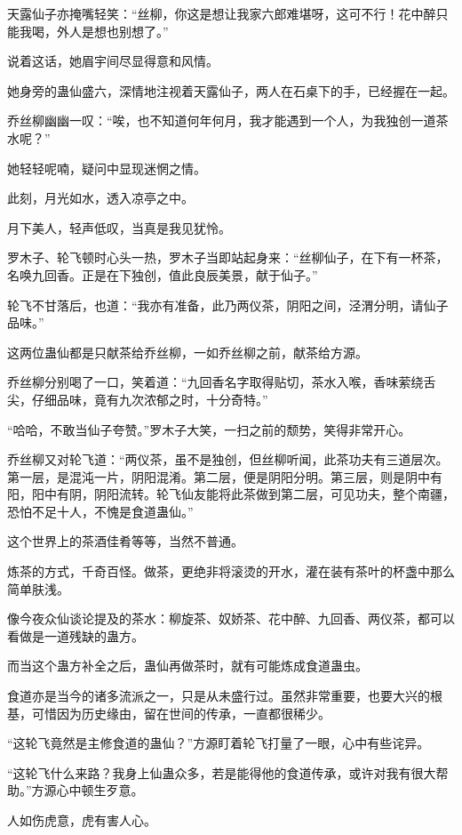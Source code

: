 \begin{this_body}
天露仙子亦掩嘴轻笑：“丝柳，你这是想让我家六郎难堪呀，这可不行！花中醉只能我喝，外人是想也别想了。”

说着这话，她眉宇间尽显得意和风情。

她身旁的蛊仙盛六，深情地注视着天露仙子，两人在石桌下的手，已经握在一起。

乔丝柳幽幽一叹：“唉，也不知道何年何月，我才能遇到一个人，为我独创一道茶水呢？”

她轻轻呢喃，疑问中显现迷惘之情。

此刻，月光如水，透入凉亭之中。

月下美人，轻声低叹，当真是我见犹怜。

罗木子、轮飞顿时心头一热，罗木子当即站起身来：“丝柳仙子，在下有一杯茶，名唤九回香。正是在下独创，值此良辰美景，献于仙子。”

轮飞不甘落后，也道：“我亦有准备，此乃两仪茶，阴阳之间，泾渭分明，请仙子品味。”

这两位蛊仙都是只献茶给乔丝柳，一如乔丝柳之前，献茶给方源。

乔丝柳分别喝了一口，笑着道：“九回香名字取得贴切，茶水入喉，香味萦绕舌尖，仔细品味，竟有九次浓郁之时，十分奇特。”

“哈哈，不敢当仙子夸赞。”罗木子大笑，一扫之前的颓势，笑得非常开心。

乔丝柳又对轮飞道：“两仪茶，虽不是独创，但丝柳听闻，此茶功夫有三道层次。第一层，是混沌一片，阴阳混淆。第二层，便是阴阳分明。第三层，则是阴中有阳，阳中有阴，阴阳流转。轮飞仙友能将此茶做到第二层，可见功夫，整个南疆，恐怕不足十人，不愧是食道蛊仙。”

这个世界上的茶酒佳肴等等，当然不普通。

炼茶的方式，千奇百怪。做茶，更绝非将滚烫的开水，灌在装有茶叶的杯盏中那么简单肤浅。

像今夜众仙谈论提及的茶水：柳旋茶、奴娇茶、花中醉、九回香、两仪茶，都可以看做是一道残缺的蛊方。

而当这个蛊方补全之后，蛊仙再做茶时，就有可能炼成食道蛊虫。

食道亦是当今的诸多流派之一，只是从未盛行过。虽然非常重要，也要大兴的根基，可惜因为历史缘由，留在世间的传承，一直都很稀少。

“这轮飞竟然是主修食道的蛊仙？”方源盯着轮飞打量了一眼，心中有些诧异。

“这轮飞什么来路？我身上仙蛊众多，若是能得他的食道传承，或许对我有很大帮助。”方源心中顿生歹意。

人如伤虎意，虎有害人心。


\end{this_body}
